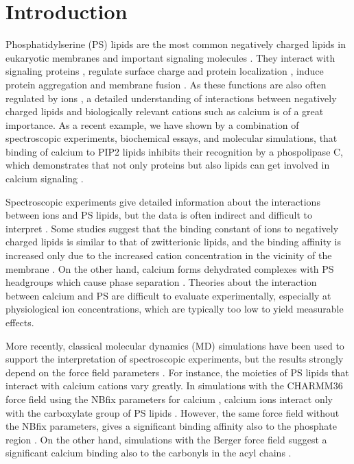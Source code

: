 \documentclass[journal=jpcbfk,manuscript=article]{achemso}
\begin{document}
 
 
\section{Introduction} 

Phosphatidylserine (PS) lipids are the most common negatively charged lipids in eukaryotic membranes
and important signaling molecules \cite{lemmon08,leventis10,li14}.
They interact with signaling proteins \cite{leventis10},
regulate surface charge and protein localization \cite{yeung08}, 
induce protein aggregation \cite{zhao04,gorbenko06} and membrane fusion \cite{??}.
As these functions are also often regulated by ions \cite{leventis10},
a detailed understanding of interactions between negatively charged lipids and biologically relevant cations such as calcium is of a great importance.
As a recent example, we have shown by a combination of spectroscopic experiments, biochemical essays, and molecular simulations, that binding of
calcium to PIP2 lipids inhibits their recognition by a phospolipase C, which demonstrates that not only proteins but also lipids can get involved in calcium 
signaling \cite{DOI: 10.1021/jacs.6b11760}.

Spectroscopic experiments give detailed information about the
interactions between ions and PS lipids, but the data is often indirect and difficult to
interpret \cite{hauser77,kurland79,eisenberg79,hauser83,dluhy83,hauser85,feigenson86,mattai89,roux90,roux91}.
Some studies suggest that the
binding constant of ions to negatively charged lipids is similar to that of zwitterionic lipids,
and the binding affinity is increased only due to the increased cation
concentration in the vicinity of the membrane \cite{seelig90,sinn06}.
On the other hand, calcium forms dehydrated complexes with PS headgroups
which cause phase separation \cite{hauser77,kurland79,hauser85,feigenson86,mattai89,roux90,roux91,boettcher11}.
Theories about the interaction between calcium and PS 
are difficult to evaluate experimentally,
especially at physiological ion concentrations,
which are typically too low to yield measurable effects.

More recently, classical molecular dynamics (MD) simulations
have been used to support the interpretation of spectroscopic experiments,
but the results strongly depend on the force field parameters \cite{boettcher11,kucerka14,melcrova16,hallock18,valentine18}.
For instance, the moieties of PS lipids that interact with calcium cations vary greatly.
In simulations with the CHARMM36 force field \cite{klauda10,venable13} using the NBfix parameters for calcium \cite{kim16}, 
calcium ions interact only with the carboxylate group of PS lipids \cite{valentine18}.
However, the same force field without the NBfix parameters, gives a significant binding affinity also to the phosphate region \cite{hallock18}.
On the other hand, simulations with the Berger force field \cite{berger97,mukhopadhyay04}
suggest a significant calcium binding also to the carbonyls in the acyl chains \cite{melcrova16}.
\end{document}
